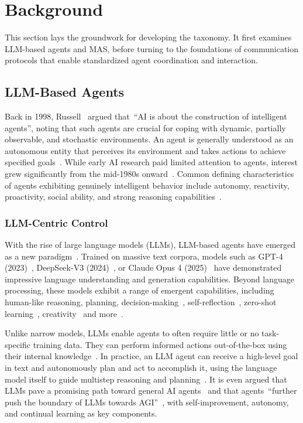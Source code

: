 \documentclass[pdflatex,sn-mathphys-num]{sn-jnl}%
\theoremstyle{thmstyleone}%
\theoremstyle{thmstyletwo}%
\theoremstyle{thmstylethree}%
\begin{document}
\section{Background} \label{sec:background}
This section lays the groundwork for developing the taxonomy. It first examines LLM-based agents and MAS, before turning to the foundations of communication protocols that enable standardized agent coordination and interaction.

\subsection{LLM-Based Agents} \label{sec:llm-based-agents}

Back in 1998, Russell~\cite{russell1998learning} argued that~\enquote{AI is about the construction of intelligent agents}, noting that such agents are crucial for coping with dynamic, partially observable, and stochastic environments. An agent is generally understood as an autonomous entity that perceives its environment and takes actions to achieve specified goals~\cite{wooldridge1995intelligent,mele1995autonomous}. While early AI research paid limited attention to agents, interest grew significantly from the mid-1980s onward~\cite{jennings1998roadmap}. Common defining characteristics of agents exhibiting genuinely intelligent behavior include autonomy, reactivity, proactivity, social ability, and strong reasoning capabilities~\cite{nwana1996software,russell1998learning,mele1995autonomous}.

\subsubsection{LLM-Centric Control}

With the rise of large language models (LLMs), LLM-based agents have emerged as a new paradigm~\cite{xi2025rise}. Trained on massive text corpora, models such as GPT-4 (2023)~\cite{achiam2023gpt}, DeepSeek-V3 (2024)~\cite{liu2024deepseek}, or Claude Opus 4 (2025)~\cite{anthropic2025claude4systemcard} have demonstrated impressive language understanding and generation capabilities. Beyond language processing, these models exhibit a range of emergent capabilities, including human-like reasoning, planning, decision-making~\cite{bang2023multitask,liu2024agentbench,achiam2023gpt}, self-reflection~\cite{chen2024teaching,madaan2023self}, zero-shot learning~\cite{kojima2022large}, creativity~\cite{li2025review} and more~\cite{zhao2023survey}.

Unlike narrow models, LLMs enable agents to often require little or no task-specific training data. They can perform informed actions out-of-the-box using their internal knowledge~\cite{brown2020language,jin2023tab,ruan2023tptu}. In practice, an LLM agent can receive a high-level goal in text and autonomously plan and act to accomplish it, using the language model itself to guide multistep reasoning and planning~\cite{besta2024graph,yao2023react,yao2023tree}. It is even argued that LLMs pave a promising path toward general AI agents~\cite{xi2025rise} and that agents~\enquote{further push the boundary of LLMs towards AGI}~\cite{zhang2023one}, with self-improvement, autonomy, and continual learning as key components.
\end{document}
